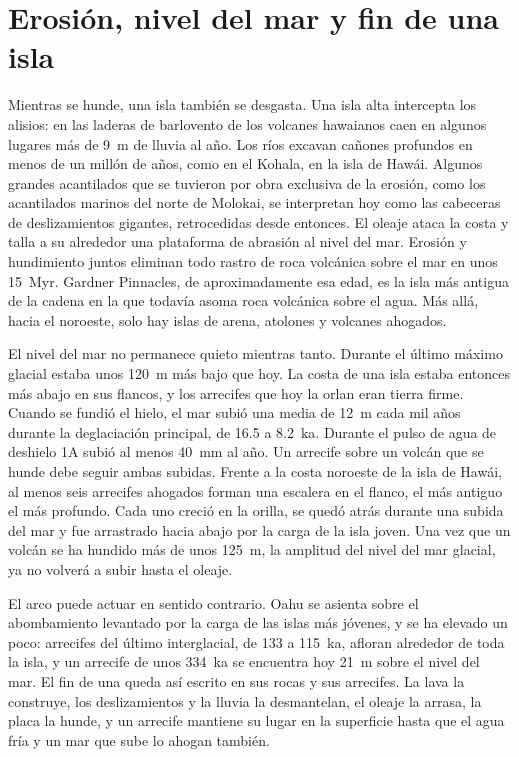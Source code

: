 \section{Erosión, nivel del mar y fin de una isla}\label{sec:b2:oceanic-islands:erosion}

Mientras se hunde, una isla también se desgasta. Una isla alta intercepta los alisios: en las
laderas de barlovento de los volcanes hawaianos caen en algunos lugares más de \qty{9}{m} de lluvia al año.
Los ríos excavan cañones profundos en menos de un millón de años, como en el Kohala, en la isla de Hawái.
Algunos grandes acantilados que se tuvieron por obra exclusiva de la erosión, como los acantilados marinos del norte de
Molokai, se interpretan hoy como las cabeceras de deslizamientos gigantes, retrocedidas desde entonces. El oleaje ataca la costa y
talla a su alrededor una plataforma de abrasión al nivel del mar. Erosión y hundimiento juntos eliminan todo rastro
de roca volcánica sobre el mar en unos \qty{15}{Myr}. Gardner Pinnacles, de aproximadamente esa edad, es
la isla más antigua de la cadena en la que todavía asoma roca volcánica sobre el agua. Más allá, hacia el
noroeste, solo hay islas de arena, atolones y volcanes ahogados.

El nivel del mar no permanece quieto mientras tanto. Durante el último máximo glacial estaba unos
\qty{120}{m} más bajo que hoy. La costa de una isla estaba entonces más abajo en sus flancos, y los arrecifes
que hoy la orlan eran tierra firme. Cuando se fundió el hielo, el mar subió una media de \qty{12}{m}
cada mil años durante la deglaciación principal, de 16.5 a \qty{8.2}{ka}. Durante el pulso de agua de deshielo
1A subió al menos \qty{40}{mm} al año. Un arrecife sobre un volcán que se hunde debe seguir ambas
subidas. Frente a la costa noroeste de la isla de Hawái, al menos seis arrecifes ahogados forman una
escalera en el flanco, el más antiguo el más profundo. Cada uno creció en la orilla, se quedó atrás durante una subida
del mar y fue arrastrado hacia abajo por la carga de la isla joven. Una vez que un volcán se ha hundido más
de unos \qty{125}{m}, la amplitud del nivel del mar glacial, ya no volverá a subir hasta el oleaje.

El arco puede actuar en sentido contrario. Oahu se asienta sobre el abombamiento levantado por la carga de las islas más jóvenes,
y se ha elevado un poco: arrecifes del último interglacial, de 133 a \qty{115}{ka}, afloran alrededor de toda
la isla, y un arrecife de unos \qty{334}{ka} se encuentra hoy \qty{21}{m} sobre el nivel del mar. El
fin de una  queda así escrito en sus rocas y sus arrecifes. La lava la construye, los deslizamientos y
la lluvia la desmantelan, el oleaje la arrasa, la placa la hunde, y un arrecife mantiene su lugar en la
superficie hasta que el agua fría y un mar que sube lo ahogan también.


